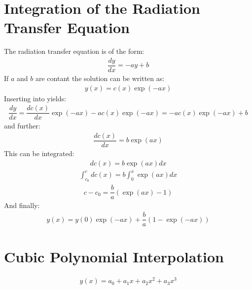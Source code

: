 
\section{Integration of the Radiation Transfer Equation}
\label{app_a_1}

The radiation transfer equation  is of the form:
\begin{align}
	\label{eqn_a_rte}
	\dfrac{dy}{dx} = - a y + b
\end{align}
If $a$ and $b$ are contant the solution can be written as:
\begin{align}
	y(x) = c(x) \exp( - a x)
\end{align}
Inserting into  yields:
\begin{align}
		\dfrac{d y}{d x} = \dfrac{d c(x)}{dx} \exp( - a x) - a c(x) \exp( - a x) = - a c(x) \exp( - a x) + b
\end{align}
and further:
\begin{align}
	\dfrac{d c(x)}{dx}  = b \exp(a x)
\end{align}
This can be integrated:
\begin{align}
	d c(x) = b \exp(a x) dx
\end{align}
\begin{align}
	\int_{c_0}^c d c(x)  =  b \int_0^x \exp(a x) dx
\end{align}
\begin{align}
	c - c_0  = \dfrac{b}{a} \left(\exp(a x) - 1\right)
\end{align}
And finally:
\begin{align}
	y(x) = y(0) \exp( - a x) + \dfrac{b}{a} \left(1 - \exp( - a x)\right)
\end{align}

\section{Cubic Polynomial Interpolation}
\label{app_a_2}
\begin{align}
	y(x) = a_0 + a_1 x + a_2 x^2 +  a_3 x^3
\end{align}

